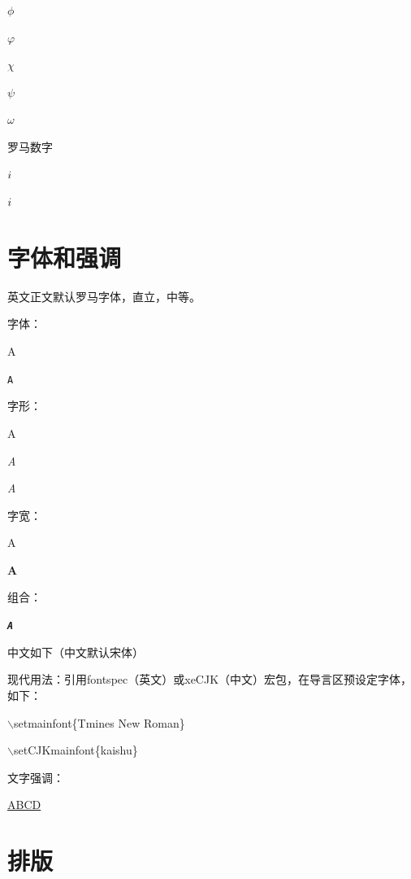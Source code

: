 \documentclass[a4paper]{article}
\begin{document}
$\phi$

$\varphi$

$\chi$

$\psi$

$\omega$

罗马数字

$\uppercase\expandafter{\romannumeral1}$  %

$\romannumeral1$  %

\section{字体和强调} %
英文正文默认罗马字体，直立，中等。

字体：

\textrm{A}   %

\texttt{A}   %

字形：

\textup{A}   %

\textit{A}   %

\textsl{A}   %

字宽：

\textmd{A}   %

\textbf{A}   %

组合：

\texttt{\textit{\textbf{A}}}   %

中文如下（中文默认宋体）





现代用法：引用fontspec（英文）或xeCJK（中文）宏包，在导言区预设定字体，如下：

$\backslash$setmainfont\{Tmines New Roman\}

$\backslash$setCJKmainfont\{kaishu\}

文字强调： %

\uline{ABCD}





\section{排版} %
\end{document}
